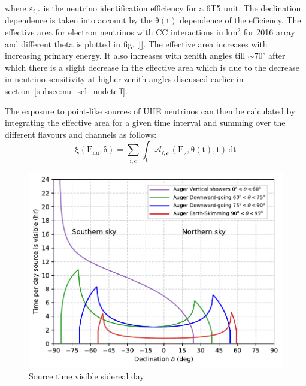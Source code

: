 where $\varepsilon_{i,c}$ is the neutrino identification efficiency for a 6T5 unit. The declination dependence is taken into account by the $\mathrm{\theta(t)}$ dependence of the efficiency. The effective area for electron neutrinos with CC interactions in km$^2$ for 2016 array and different theta is plotted in fig.~\ref{}. The effective area increases with increasing primary energy. It also increases with zenith angles till $\sim$70$^\circ$ after which there is a slight decrease in the effective area which is due to the decrease in neutrino sensitivity at higher zenith angles discussed earlier in section~\ref{subsec:nu_sel_nudeteff}. 

The exposure to point-like sources of UHE neutrinos can then be calculated by integrating the effective area for a given time interval and summing over the different flavours and channels as follows:
\begin{equation}
  \label{eq:exposure_point}
  \mathrm{\xi(E_{nu}, \delta) = \sum_{i,c} \int_{t} \mathcal{A_{i,c}} \, (E_{\nu},\theta(t),t) \, dt}
\end{equation}

\begin{figure}[t!]
  \centering
  \includegraphics[width=14.5cm]{thesis_figures/PointLimits/Time_per_day.pdf}
  \caption{Source time visible sidereal day}
  \label{fig:time_per_day}
\end{figure}



